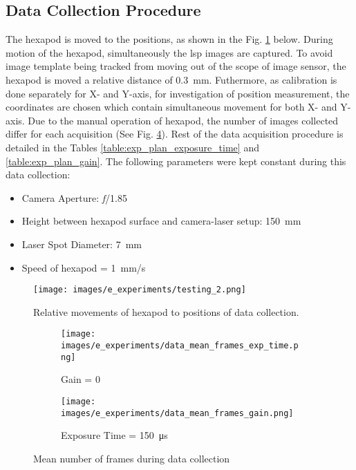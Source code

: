     \subsection*{Data Collection Procedure}\label{subsection:data_collection_procedure}
        The hexapod is moved to the positions, as shown in the Fig. \ref{fig:testing_2.png} below. During motion of the hexapod, simultaneously the \gls{lsp} images are captured. To avoid image template being tracked from moving out of the scope of image sensor, the hexapod is moved a relative distance of \SI{0.3}{\milli\meter}. Futhermore, as calibration is done separately for X- and Y-axis, for investigation of position measurement, the coordinates are chosen which contain simultaneous movement for both X- and Y-axis. Due to the manual operation of hexapod, the number of images collected differ for each acquisition (See Fig. \ref{fig:mean_frames_data_collection}). Rest of the data acquisition procedure is detailed in the Tables \ref{table:exp_plan_exposure_time} and \ref{table:exp_plan_gain}. The following parameters were kept constant during this data collection:
        
        \begin{itemize}
            \item Camera Aperture: \emph{f}/1.85
            \item Height between hexapod surface and camera-laser setup: \SI{150}{\milli\meter}
            \item Laser Spot Diameter: \SI{7}{\milli\meter}
            \item Speed of hexapod = \SI{1}{\milli\meter/\second}
        \end{itemize}

        \begin{figure}[ht]
            \centering
            \texttt{[image: images/e\_experiments/testing\_2.png]}
            \caption{Relative movements of hexapod to positions of data collection.}
            \label{fig:testing_2.png}
        \end{figure}

        \begin{figure}[ht]
            \centering
            \begin{subfigure}{0.55\textwidth}
                \texttt{[image: images/e\_experiments/data\_mean\_frames\_exp\_time.png]}
                \caption{Gain = 0}
                \label{subfig:data_mean_frames_exp_time.png}
            \end{subfigure}

            \begin{subfigure}{0.55\textwidth}
                \texttt{[image: images/e\_experiments/data\_mean\_frames\_gain.png]}
                \caption{Exposure Time = \SI{150}{\micro\second}}
                \label{subfig:data_mean_frames_exp_time.png}
            \end{subfigure}
            \caption{Mean number of frames during data collection}
            \label{fig:mean_frames_data_collection}
        \end{figure}


